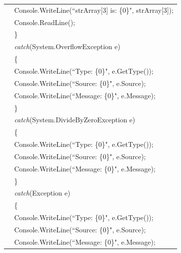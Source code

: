 \begin{program}
\begin{tabular}{ >{\codelinenumfont}c >{\codelistingfont}l}
35 & \hspace{0.8in} Console.WriteLine(``strArray[3] is: \{0\}", strArray[3]);  \\
36 & \hspace{0.8in} Console.ReadLine();  \\
37 & \hspace{0.6in} \}  \\
38 & \hspace{0.6in} \emph{catch}(System.OverflowException e)  \\
39 & \hspace{0.6in} \{  \\
40 & \hspace{0.8in} Console.WriteLine(``Type: \{0\}", e.GetType());  \\
41 & \hspace{0.8in} Console.WriteLine(``Source: \{0\}", e.Source);  \\
42 & \hspace{0.8in} Console.WriteLine(``Message: \{0\}", e.Message);  \\
43 & \hspace{0.6in} \}  \\
44 & \hspace{0.6in} \emph{catch}(System.DivideByZeroException e)  \\
45 & \hspace{0.6in} \{  \\
46 & \hspace{0.8in} Console.WriteLine(``Type: \{0\}", e.GetType());  \\
47 & \hspace{0.8in} Console.WriteLine(``Source: \{0\}", e.Source);  \\
48 & \hspace{0.8in} Console.WriteLine(``Message: \{0\}", e.Message);  \\
49 & \hspace{0.6in} \}  \\
50 & \hspace{0.6in} \emph{catch}(Exception e)  \\
51 & \hspace{0.6in} \{  \\
52 & \hspace{0.8in} Console.WriteLine(``Type: \{0\}", e.GetType());  \\
53 & \hspace{0.8in} Console.WriteLine(``Source: \{0\}", e.Source);  \\
54 & \hspace{0.8in} Console.WriteLine(``Message: \{0\}", e.Message);  \\

\end{tabular}
\end{program}

